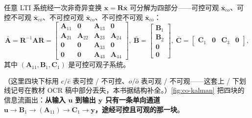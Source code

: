 \begin{theorem}\label{thm:co-kalman-decomp}
任意 LTI 系统经一次非奇异变换 $\mathbf{x}=\mathbf{R}\bar{\mathbf{x}}$ 可分解为四部分——可控可观 $\bar{\mathbf{x}}_{co}$、可控不可观 $\bar{\mathbf{x}}_{c\bar{o}}$、不可控可观 $\bar{\mathbf{x}}_{\bar{c}o}$、不可控不可观 $\bar{\mathbf{x}}_{\bar{c}\bar{o}}$\cite{liubao2006modern}：
\begin{equation}
  \bar{\mathbf{A}}=\mathbf{R}^{-1}\mathbf{A}\mathbf{R}=\begin{bmatrix}
    \mathbf{A}_{11}&\mathbf{0}&\mathbf{A}_{13}&\mathbf{0}\\
    \mathbf{A}_{21}&\mathbf{A}_{22}&\mathbf{A}_{23}&\mathbf{A}_{24}\\
    \mathbf{0}&\mathbf{0}&\mathbf{A}_{33}&\mathbf{0}\\
    \mathbf{0}&\mathbf{0}&\mathbf{A}_{43}&\mathbf{A}_{44}
  \end{bmatrix},\
  \bar{\mathbf{B}}=\begin{bmatrix}\mathbf{B}_1\\ \mathbf{B}_2\\ \mathbf{0}\\ \mathbf{0}\end{bmatrix},\
  \bar{\mathbf{C}}=\begin{bmatrix}\mathbf{C}_1&\mathbf{0}&\mathbf{C}_3&\mathbf{0}\end{bmatrix},
  \label{eq:co-kalman-4block}
\end{equation}
其中 $(\mathbf{A}_{11},\mathbf{B}_1,\mathbf{C}_1)$ 是可控可观子系统。
\end{theorem}

\noindent{}（这里四块下标用 $c/\bar c$ 表可控 / 不可控、$o/\bar o$ 表可观 / 不可观——这套上 / 下划线记号在教材 OCR 稿中部分丢失，本书据结构补全。）\cref{fig:co-kalman} 把四块的信息流画出：\textbf{从输入 $\mathbf{u}$ 到输出 $\mathbf{y}$ 只有一条单向通道 $\mathbf{u}\to\mathbf{B}_1\to(\mathbf{A}_{11})\to\mathbf{C}_1\to\mathbf{y}$，途经可控且可观的那一块}。


